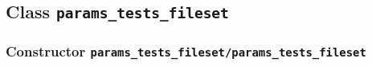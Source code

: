 \subsection{Class \texttt{params\_tests\_fileset}}%
%
\label{ref_params_tests_fileset}%
\hypertarget{ref_params_tests_fileset}{}%
\subsubsection[Constructor \texttt{params\_tests\_fileset}]{Constructor \texttt{params\_tests\_fileset/params\_tests\_fileset}}%
%
\label{ref_params_tests_fileset__params_tests_fileset}%
\hypertarget{ref_params_tests_fileset__params_tests_fileset}{}%

